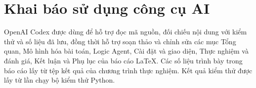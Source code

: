 \section{Khai báo sử dụng công cụ AI}
OpenAI Codex được dùng để hỗ trợ đọc mã nguồn, đối chiếu nội dung với
kiểm thử và số liệu đã lưu, đồng thời hỗ trợ soạn thảo và chỉnh sửa
các mục Tổng quan, Mô hình hóa bài toán, Logic Agent, Cài đặt và giao
diện, Thực nghiệm và đánh giá, Kết luận và Phụ lục của báo cáo LaTeX.
Các số liệu trình bày trong báo cáo lấy từ tệp kết quả của chương trình
thực nghiệm. Kết quả kiểm thử được lấy từ lần chạy bộ kiểm thử Python.
